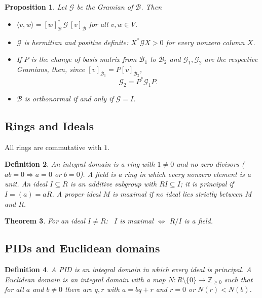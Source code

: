 \documentclass[12pt]{article}
\theoremstyle{breakplain}
\newtheorem{theorem}{Theorem}[section]
\newtheorem{prop}[theorem]{Proposition}
\theoremstyle{breakdef}
\newtheorem{definition}[theorem]{Definition}
\theoremstyle{remark}
\begin{document}
\begin{prop}
    Let $\mathscr{G}$ be the Gramian of $\mathcal{B}$. Then
    \begin{itemize}
        \item $\langle v,w\rangle=[w]_{\mathcal{B}}^*\,\mathscr{G}\,[v]_{\mathcal{B}}$ for all $v,w\in V$.
        \item $\mathscr{G}$ is hermitian and positive definite: $X^*\mathscr{G}X>0$ for every nonzero column $X$.
        \item If $P$ is the change of basis matrix from $\mathcal{B}_1$ to $\mathcal{B}_2$ and $\mathscr{G}_1,\mathscr{G}_2$ are the respective Gramians, then, since $[v]_{\mathcal{B}_1}=P[v]_{\mathcal{B}_2}$,
        \[\mathscr{G}_2=P^*\mathscr{G}_1P.\]
        \item $\mathcal{B}$ is orthonormal if and only if $\mathscr{G}=I$.
    \end{itemize}
\end{prop}
\subsection{Rings and Ideals}
All rings are commutative with $1$.
 
\begin{definition}
An \emph{integral domain} is a ring with $1\neq0$ and no zero divisors ($ab=0\Rightarrow a=0$ or $b=0$).
A \emph{field} is a ring in which every nonzero element is a unit.
An \emph{ideal} $I\subseteq R$ is an additive subgroup with $RI\subseteq I$; it is \emph{principal} if $I=(a)=aR$.
A proper ideal $M$ is \emph{maximal} if no ideal lies strictly between $M$ and $R$.
\end{definition}
 
\begin{theorem}
For an ideal $I\neq R$: \ $I$ is maximal $\iff$ $R/I$ is a field.
\end{theorem}
 
\subsection*{PIDs and Euclidean domains}
 
\begin{definition}
A \emph{PID} is an integral domain in which every ideal is principal.
A \emph{Euclidean domain} is an integral domain with a map $N:R\setminus\{0\}\to\mathbb{Z}_{\ge0}$ such that
for all $a$ and $b\neq0$ there are $q,r$ with $a=bq+r$ and $r=0$ or $N(r)<N(b)$.
\end{definition}
 
\end{document}
